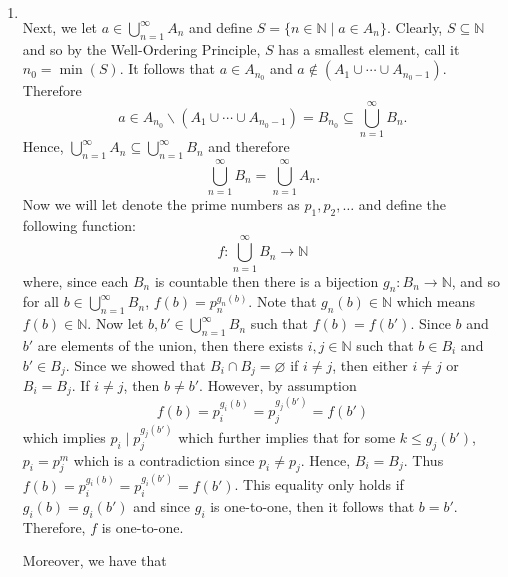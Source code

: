 \documentclass[12pt]{article}
\makeatletter
\theoremstyle{definition}
\theoremstyle{remark}
\renewenvironment{proof}[1][\proofname]{\par
  \pushQED{\qed}%
  \normalfont \topsep6\p@\@plus6\p@\relax
  \list{}{\leftmargin=0mm
          \rightmargin=4mm
          \settowidth{\itemindent}{\itshape#1}%
          \labelwidth=\itemindent
          \parsep=0pt \listparindent=\parindent 
  }
  \item[\hskip\labelsep
        \itshape
    #1\@addpunct{.}]\ignorespaces
}{%
  \popQED\endlist\@endpefalse
}
\let\oldproofname=\proofname
\renewcommand{\proofname}{\bf{\textit{\oldproofname}}}
\makeatother
\begin{document}
\begin{enumerate}[leftmargin=*]
\begin{proof}
\begin{equation*}
                    \end{equation*}
                Next, we let $a\in\bigcup_{n=1}^{\infty} A_n$ and define $S=\{n\in\mathbb{N}\mid a\in A_n\}$. Clearly, $S\subseteq\mathbb{N}$ and so by the Well-Ordering Principle, $S$ has a smallest element, call it $n_0=\min(S)$. It follows that $a\in A_{n_0}$ and $a\notin(A_1\cup\cdots\cup A_{n_0-1})$. Therefore
                    \begin{equation*}
                        a\in A_{n_0}\backslash(A_1\cup\cdots\cup A_{n_0-1})=B_{n_0}\subseteq\bigcup_{n=1}^{\infty} B_n.
                    \end{equation*}
                Hence, $\bigcup_{n=1}^{\infty}A_n\subseteq\bigcup_{n=1}^{\infty}B_n$ and therefore
                    \begin{equation*}
                        \bigcup_{n=1}^{\infty}B_n=\bigcup_{n=1}^{\infty}A_n.
                    \end{equation*}
                Now we will let denote the prime numbers as $p_1,p_2,\dots$ and define the following function:
                    \begin{equation*}
                        f\colon\bigcup_{n=1}^{\infty}B_n\rightarrow\mathbb{N}
                    \end{equation*}
                where, since each $B_n$ is countable then there is a bijection $g_n\colon B_n\rightarrow\mathbb{N}$, and so for all $b\in\bigcup_{n=1}^{\infty}B_n$, $f(b)=p_n^{g_n(b)}$. Note that $g_n(b)\in\mathbb{N}$ which means $f(b)\in\mathbb{N}$. Now let $b,b'\in\bigcup_{n=1}^{\infty}B_n$ such that $f(b)=f(b')$. Since $b$ and $b'$ are elements of the union, then there exists $i,j\in\mathbb{N}$ such that $b\in B_i$ and $b'\in B_j$. Since we showed that $B_i\cap B_j=\varnothing$ if $i\neq j$, then either $i\neq j$ or $B_i=B_j$. If $i\neq j$, then $b\neq b'$. However, by assumption
                    \begin{equation*}
                        f(b)=p_i^{g_i(b)}=p_j^{g_j(b')}=f(b')
                    \end{equation*}
                which implies $p_i\mid p_j^{g_j(b')}$ which further implies that for some $k\leq g_j(b')$, $p_i=p_j^m$ which is a contradiction since $p_i\neq p_j$. Hence, $B_i=B_j$. Thus $f(b)=p_i^{g_i(b)}=p_i^{g_i(b')}=f(b')$. This equality only holds if $g_i(b)=g_i(b')$ and since $g_i$ is one-to-one, then it follows that $b=b'$. Therefore, $f$ is one-to-one.\par\hspace{4mm} Moreover, we have that 

\end{proof}
\end{enumerate}
\end{document}
